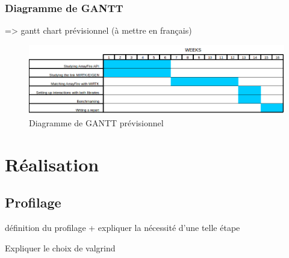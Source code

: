 \documentclass[12pt]{report}
\begin{document}
	
	\subsection{Diagramme de GANTT}
	 => gantt chart prévisionnel (à mettre en français)
	\begin{figure}[h!]
		\begin{center}
			\includegraphics[width=18cm]{Reports/figures/estimated_gantt.png}
		\end{center}	
		\caption{Diagramme de GANTT prévisionnel}
		\label{Diagramme de GANTT prévisionnel}
	\end{figure}
\chapter{Réalisation}
	\section{Profilage}
	définition du profilage + expliquer la nécessité d'une telle étape \newline
	
	Expliquer le choix de valgrind 
%	
	
\end{document}
